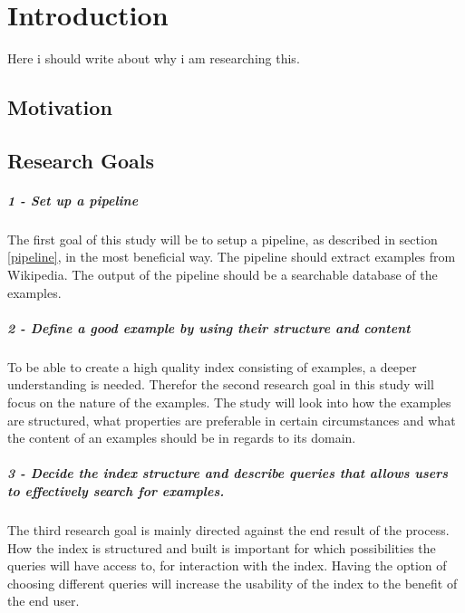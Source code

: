 
\chapter{Introduction}

Here i should write about why i am researching this.

\section{Motivation}

\section{Research Goals}

\paragraph{1 - Set up a pipeline}
The first goal of this study will be to setup a pipeline, as described in section \ref{pipeline}, in the most beneficial way. The pipeline should extract examples from Wikipedia. The output of the pipeline should be a searchable database of the examples.

\paragraph{2 - Define a good example by using their structure and content}
To be able to create a high quality index consisting of examples, a deeper understanding is needed. Therefor the second research goal in this study will focus on the nature of the examples. The study will look into how the examples are structured, what properties are preferable in certain circumstances and what the content of an examples should be in regards to its domain. 

\paragraph{3 - Decide the index structure and describe queries that allows users to effectively search for examples.}
The third research goal is mainly directed against the end result of the process. How the index is structured and built is important for which possibilities the queries will have access to, for interaction with the index. Having the option of choosing different queries will increase the usability of the index to the benefit of the end user. 


